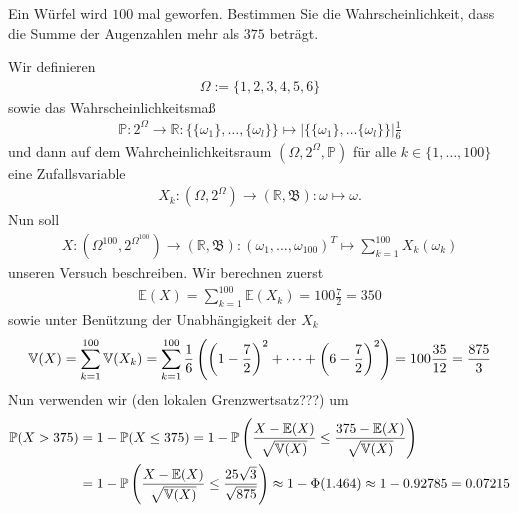 \begin{exercise}

Ein Würfel wird $100$ mal geworfen. Bestimmen Sie die Wahrscheinlichkeit, dass die Summe der Augenzahlen mehr als $375$ beträgt.

\end{exercise}

\begin{solution}

Wir definieren
\begin{align*}
    \Omega := \{1,2,3,4,5,6\}
\end{align*}
sowie das Wahrscheinlichkeitsmaß
\begin{align*}
    \mathbb{P}:2^\Omega \to \mathbb{R}: \{\{\omega_1\},\dots,\{\omega_l\}\} \mapsto \vert \{\{\omega_1\},\dots\{\omega_l\}\} \vert \frac{1}{6}
\end{align*}
und dann auf dem Wahrcheinlichkeitsraum $(\Omega,2^\Omega,\mathbb{P})$ für alle $k \in \{1,\dots,100\}$ eine Zufallsvariable
\begin{align*}
    X_k:(\Omega,2^\Omega) \to (\mathbb{R},\mathfrak{B}): \omega \mapsto \omega.
\end{align*}
Nun soll
\begin{align*}
    X:(\Omega^{100},2^{\Omega^{100}}) \to (\mathbb{R},\mathfrak{B}): (\omega_1,\dots,\omega_{100})^T \mapsto \sum_{k=1}^{100} X_k(\omega_k)
\end{align*}
unseren Versuch beschreiben. Wir berechnen zuerst
\begin{align*}
    \mathbb{E}(X) = \sum_{k=1}^{100} \mathbb{E}(X_k) = 100\frac{7}{2} = 350
\end{align*}
sowie unter Benützung der Unabhängigkeit der $X_k$
\begin{align*}
    \mathbb{V}(X) = \sum_{k=1}^{100} \mathbb{V}(X_k) = \sum_{k=1}^{100} \frac{1}{6} \left ( \left ( 1-\frac{7}{2} \right )^2+\cdots+\left ( 6-\frac{7}{2} \right )^2 \right ) = 100 \frac{35}{12} = \frac{875}{3}
\end{align*}
Nun verwenden wir (den lokalen Grenzwertsatz???) um
\begin{align*}
    \mathbb{P}(X > 375) &= 1 - \mathbb{P}(X \leq 375) = 1 - \mathbb{P}\left ( \frac{X - \mathbb{E}(X)}{\sqrt{\mathbb{V}(X)}} \leq \frac{375 - \mathbb{E}(X)}{\sqrt{\mathbb{V}(X)}} \right ) \\
    &= 1 - \mathbb{P}\left ( \frac{X - \mathbb{E}(X)}{\sqrt{\mathbb{V}(X)}} \leq \frac{25\sqrt{3}}{\sqrt{875}} \right ) \approx 1 - \Phi(1.464) \approx 1 - 0.92785 = 0.07215
\end{align*}
\end{solution}
